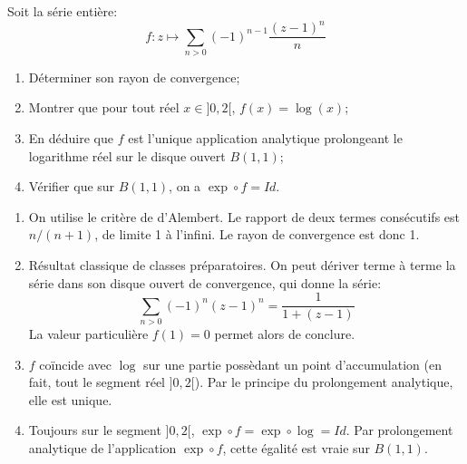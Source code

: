 \documentclass[a4paper, 12pt]{amsart}
\begin{document}
\begin{fex}
 Soit la série entière:
\[
f \colon z \mapsto \sum_{n >0}(-1)^{n-1}\frac{(z-1)^n}{n}
\]
\begin{enumerate}
  \item Déterminer son rayon de convergence;
  \item Montrer que pour tout réel $x \in ]0,2[$, $f(x)=\log(x)$;
  \item En déduire que $f$ est l'unique application analytique prolongeant le
  logarithme réel sur le disque ouvert $B(1,1)$;
  \item Vérifier que sur $B(1,1)$, on a $\exp \circ f = Id$.
\end{enumerate}
\end{fex}
\begin{enumerate}
 \item On utilise le critère de d'Alembert. Le rapport de deux termes
consécutifs est $n/(n+1)$, de limite 1 à l'infini. Le rayon de convergence est
donc 1.
\item Résultat classique de classes préparatoires. On peut dériver terme à
terme la série dans son disque ouvert de convergence, qui donne la série:
\[
\sum_{n >0}(-1)^{n} (z-1)^n = \frac{1}{1+(z-1)}
\]
La valeur particulière $f(1)=0$ permet alors de conclure.
\item $f$ coïncide avec $\log$ sur une partie possèdant un point d'accumulation
(en fait, tout le segment réel $]0,2[$). Par le principe du prolongement
analytique, elle est unique.
\item Toujours sur le segment $]0,2[$, $\exp \circ f = \exp \circ \log = Id$.
Par prolongement analytique de l'application $\exp \circ f$, cette égalité est
vraie sur $B(1,1)$.
\end{enumerate}
\end{document}
